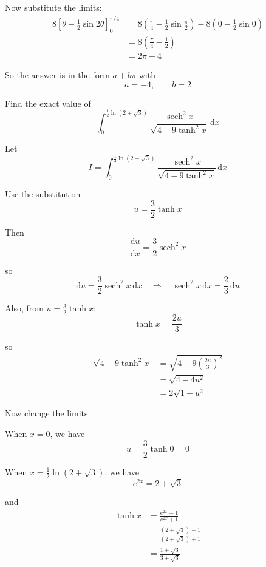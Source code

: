 \documentclass[leqno]{article}
\begin{document}
\begin{enumerate}[
  label=\textbf{\arabic*.},
  leftmargin=*,
  topsep=0pt,
  partopsep=0pt,
  parsep=0pt
]
\begin{djsSolution}
Now substitute the limits:
\begin{align*}
8\left[\theta-\frac{1}{2}\sin2\theta\right]_0^{\pi/4}
&=8\left(\frac{\pi}{4}-\frac{1}{2}\sin\frac{\pi}{2}\right)-8\left(0-\frac{1}{2}\sin0\right) \\
&=8\left(\frac{\pi}{4}-\frac{1}{2}\right) \\
&=2\pi-4
\end{align*}

So the answer is in the form $a+b\pi$ with
\[
a=-4,\qquad b=2
\]
\end{djsSolution}


\newpage

\questionitem

Find the exact value of 
\[
\int_0^{\frac{1}{2}\ln(2+\sqrt{3})} \frac{\operatorname{sech}^2 x}{\sqrt{4 - 9\tanh^2 x}}\,\mathrm{d}x
\]

\vspace*{10pt}

\begin{djsSolution}
Let
\[
I=\int_0^{\frac{1}{2}\ln(2+\sqrt{3})} \frac{\operatorname{sech}^2 x}{\sqrt{4 - 9\tanh^2 x}}\,\mathrm{d}x
\]

Use the substitution
\[
u=\frac{3}{2}\tanh x
\]

Then
\[
\frac{\mathrm{d}u}{\mathrm{d}x}=\frac{3}{2}\operatorname{sech}^2 x
\]

so
\[
\mathrm{d}u=\frac{3}{2}\operatorname{sech}^2 x\,\mathrm{d}x
\quad\Longrightarrow\quad
\operatorname{sech}^2 x\,\mathrm{d}x=\frac{2}{3}\,\mathrm{d}u
\]

Also, from \(u=\frac{3}{2}\tanh x\):
\[
\tanh x=\frac{2u}{3}
\]

so
\begin{align*}
\sqrt{4-9\tanh^2 x}
&=\sqrt{4-9\left(\frac{2u}{3}\right)^2} \\
&=\sqrt{4-4u^2} \\
&=2\sqrt{1-u^2}
\end{align*}

Now change the limits.

When \(x=0\), we have
\[
u=\frac{3}{2}\tanh 0=0
\]

When \(x=\frac{1}{2}\ln(2+\sqrt{3})\), we have
\[
e^{2x}=2+\sqrt{3}
\]

and
\begin{align*}
\tanh x
&=\frac{e^{2x}-1}{e^{2x}+1} \\
&=\frac{(2+\sqrt{3})-1}{(2+\sqrt{3})+1} \\
&=\frac{1+\sqrt{3}}{3+\sqrt{3}}
\end{align*}


\end{djsSolution}
\end{enumerate}
\end{document}
